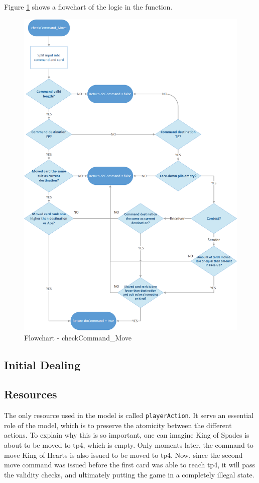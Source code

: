 \documentclass[runningheads,a4paper]{llncs}
\begin{document}
Figure \ref{fig:checkCommand_Move} shows a flowchart of the logic in the function.
\begin{figure}
	\begin{center}
		\includegraphics[width=\textwidth]{images/checkcommandmove}
		\caption{Flowchart - checkCommand\_Move}
		\label{fig:checkCommand_Move}
	\end{center}
\end{figure}
\clearpage
\subsection{Initial Dealing}
\subsection{Resources}
\label{sec:3_Resources}
The only resource used in the model is called \verb!playerAction!. It serve an essential role of the model, which is to preserve the atomicity between the different actions. To explain why this is so important, one can imagine King of Spades is about to be moved to \ac{tp}4, which is empty. Only moments later, the command to move King of Hearts is also issued to be moved to \ac{tp}4. Now, since the second move command was issued before the first card was able to reach \ac{tp}4, it will pass the validity checks, and ultimately putting the game in a completely illegal state.\\
\end{document}
